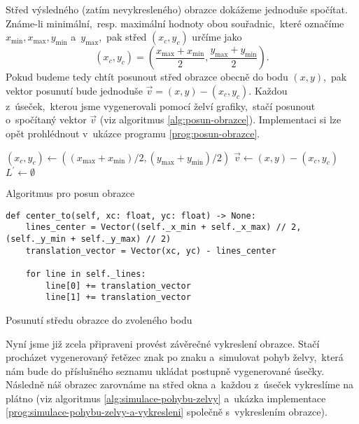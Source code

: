 Střed výsledného (zatím nevykresleného) obrazce dokážeme jednoduše spočítat. Známe-li minimální,~resp. maximální hodnoty obou souřadnic,~které označíme $x_{\text{min}},x_{\text{max}},y_{\text{min}}$ a~$y_{\text{max}}$,~pak střed $(x_c,y_c)$ určíme jako
\[(x_c,y_c)=\left(\dfrac{x_{\text{max}}+x_{\text{min}}}{2},\dfrac{y_{\text{max}}+y_{\text{min}}}{2}\right).\]
Pokud budeme tedy chtít posunout střed obrazce obecně do bodu $(x,y)$,~pak vektor posunutí bude jednoduše $\vec{v}=(x,y)-(x_c,y_c)$. Každou z~úseček,~kterou jsme vygenerovali pomocí želví grafiky,~stačí posunout o~spočítaný vektor $\vec{v}$ (viz algoritmus \ref{alg:posun-obrazce}). Implementaci si lze opět prohlédnout v~ukázce programu \ref{prog:posun-obrazce}.
\begin{algorithm}[h]
    $(x_c,y_c)\gets((x_{\text{max}}+x_{\text{min}})/2,(y_{\text{max}}+y_{\text{min}})/2)$\;
    $\vec{v}\gets(x,y)-(x_c,y_c)$\;
    $L^\prime\gets\emptyset$\;
    \;
    \caption{Algoritmus pro posun obrazce}
    \label{alg:posun-obrazce}
\end{algorithm}
\begin{program}[h]
\begin{lstlisting}[style=python]
def center_to(self, xc: float, yc: float) -> None:
    lines_center = Vector((self._x_min + self._x_max) // 2, (self._y_min + self._y_max) // 2)
    translation_vector = Vector(xc, yc) - lines_center

    for line in self._lines:
        line[0] += translation_vector
        line[1] += translation_vector
\end{lstlisting}
    \caption{Posunutí středu obrazce do zvoleného bodu}
    \label{prog:posun-obrazce}
\end{program}
Nyní jsme již zcela připraveni provést závěrečné vykreslení obrazce. Stačí procházet vygenerovaný řetězec znak po znaku a~simulovat pohyb želvy,~která nám bude do příslušného seznamu ukládat postupně vygenerované úsečky. Následně náš obrazec zarovnáme na střed okna a~každou z~úseček vykreslíme na plátno (viz algoritmus \ref{alg:simulace-pohybu-zelvy} a~ukázka implementace \ref{prog:simulace-pohybu-zelvy-a-vykresleni} společně s~vykreslením obrazce).
